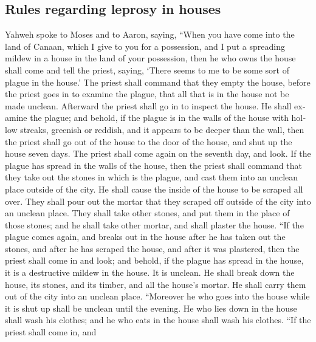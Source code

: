 \begin{paracol}{2}
\begin{otherlanguage}{english}
\hypertarget{rules-regarding-leprosy-in-houses}{%
\subsection{Rules regarding leprosy in
houses}\label{rules-regarding-leprosy-in-houses}}

 Yahweh spoke to Moses and to Aaron, saying,
 ``When you have come into the land of Canaan, which I
give to you for a possession, and I put a spreading mildew in a house in
the land of your possession,  then he who owns the house
shall come and tell the priest, saying, `There seems to me to be some
sort of plague in the house.'  The priest shall command
that they empty the house, before the priest goes in to examine the
plague, that all that is in the house not be made unclean. Afterward the
priest shall go in to inspect the house.  He shall
examine the plague; and behold, if the plague is in the walls of the
house with hollow streaks, greenish or reddish, and it appears to be
deeper than the wall,  then the priest shall go out of
the house to the door of the house, and shut up the house seven days.
 The priest shall come again on the seventh day, and
look. If the plague has spread in the walls of the house,
 then the priest shall command that they take out the
stones in which is the plague, and cast them into an unclean place
outside of the city.  He shall cause the inside of the
house to be scraped all over. They shall pour out the mortar that they
scraped off outside of the city into an unclean place. 
They shall take other stones, and put them in the place of those stones;
and he shall take other mortar, and shall plaster the house.
 ``If the plague comes again, and breaks out in the house
after he has taken out the stones, and after he has scraped the house,
and after it was plastered,  then the priest shall come
in and look; and behold, if the plague has spread in the house, it is a
destructive mildew in the house. It is unclean.  He shall
break down the house, its stones, and its timber, and all the house's
mortar. He shall carry them out of the city into an unclean place.
 ``Moreover he who goes into the house while it is shut
up shall be unclean until the evening.  He who lies down
in the house shall wash his clothes; and he who eats in the house shall
wash his clothes.  ``If the priest shall come in, and

\end{otherlanguage}
\end{paracol}
